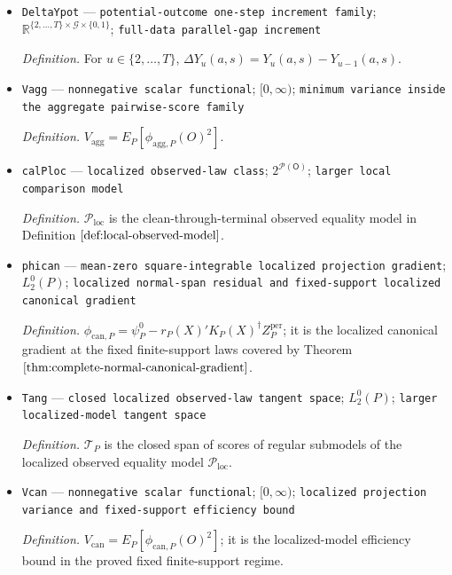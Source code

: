 \documentclass{article}
\begin{document}
\begin{itemize}
  \par\smallskip\noindent\emph{Definition.} \(\phi_{\mathrm{agg},P}(O)=b^\star(X)'\Psi_P(O)\).
  \item \texttt{DeltaYpot} --- \texttt{potential-\allowbreak{}outcome one-\allowbreak{}step increment family}; \(\mathbb R^{\{2,\ldots,T\}\times\mathcal G\times\{0,1\}}\); \texttt{full-\allowbreak{}data parallel-\allowbreak{}gap increment}
  \par\smallskip\noindent\emph{Definition.} For \(u\in\{2,\ldots,T\}\), \(\Delta Y_u(a,s)=Y_u(a,s)-Y_{u-1}(a,s)\).
  \item \texttt{Vagg} --- \texttt{nonnegative scalar functional}; \([0,\infty)\); \texttt{minimum variance inside the aggregate pairwise-\allowbreak{}score family}
  \par\smallskip\noindent\emph{Definition.} \(V_{\mathrm{agg}}=E_P[\phi_{\mathrm{agg},P}(O)^2]\).
  \item \texttt{calPloc} --- \texttt{localized observed-\allowbreak{}law class}; \(2^{\mathcal P(\mathsf O)}\); \texttt{larger local comparison model}
  \par\smallskip\noindent\emph{Definition.} \(\mathcal P_{\mathrm{loc}}\) is the clean-through-terminal observed equality model in Definition \(\ref{def:local-observed-model}\).
  \item \texttt{phican} --- \texttt{mean-\allowbreak{}zero square-\allowbreak{}integrable localized projection gradient}; \(L_2^0(P)\); \texttt{localized normal-\allowbreak{}span residual and fixed-\allowbreak{}support localized canonical gradient}
  \par\smallskip\noindent\emph{Definition.} \(\phi_{\mathrm{can},P}=\psi_P^0-r_P(X)'K_P(X)^\dagger Z_P^{\mathrm{per}}\); it is the localized canonical gradient at the fixed finite-support laws covered by Theorem \(\ref{thm:complete-normal-canonical-gradient}\).
  \item \texttt{Tang} --- \texttt{closed localized observed-\allowbreak{}law tangent space}; \(L_2^0(P)\); \texttt{larger localized-\allowbreak{}model tangent space}
  \par\smallskip\noindent\emph{Definition.} \(\mathcal T_P\) is the closed span of scores of regular submodels of the localized observed equality model \(\mathcal P_{\mathrm{loc}}\).
  \item \texttt{Vcan} --- \texttt{nonnegative scalar functional}; \([0,\infty)\); \texttt{localized projection variance and fixed-\allowbreak{}support efficiency bound}
  \par\smallskip\noindent\emph{Definition.} \(V_{\mathrm{can}}=E_P[\phi_{\mathrm{can},P}(O)^2]\); it is the localized-model efficiency bound in the proved fixed finite-support regime.

\end{itemize}
\end{document}
